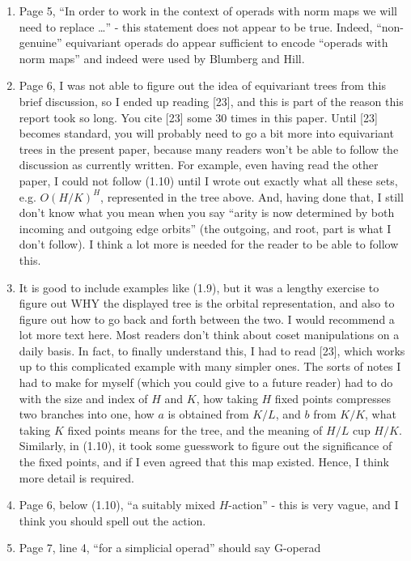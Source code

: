 \documentclass{article}
\begin{document}
\begin{enumerate}
\item
Page 5, ``In order to work in the context of operads with norm maps we will
need to replace \dots'' - this statement does not appear to be true. Indeed, ``non-genuine'' equivariant operads do appear sufficient to encode ``operads with norm maps'' and indeed were used by Blumberg and Hill. 

\item
Page 6, I was not able to figure out the idea of equivariant trees from this brief discussion, so I ended up reading [23], and this is part of the reason this report took so long. You cite [23] some 30 times in this paper. Until [23] becomes standard, you will probably need to go a bit more into equivariant trees in the present paper, because many readers won't be able to follow the discussion as currently written. For example, even having read the other paper, I could not follow (1.10) until I wrote out exactly what all these sets, e.g. $O(H/K)^H$, represented in the tree above. And, having done that, I still don't know what you mean when you say ``arity is now determined by both incoming and outgoing edge orbits'' (the outgoing, and root, part is what I don't follow). I think a lot more is needed for the reader to be able to follow this.

\item 
It is good to include examples like (1.9), but it was a lengthy exercise to figure out WHY the displayed tree is the orbital representation, and also to figure out how to go back and forth between the two. I would recommend a lot more text here. Most readers don't think about coset manipulations on a daily basis. In fact, to finally understand this, I had to read [23], which works up to this complicated example with many simpler ones. The sorts of notes I had to make for myself (which you could give to a future reader) had to do with the size and index of $H$ and $K$, how taking $H$ fixed points compresses two branches into one, how $a$ is obtained from $K/L$, and $b$ from $K/K$, what taking $K$ fixed points means for the tree, and the meaning of $H/L$ cup $H/K$. Similarly, in (1.10), it took some guesswork to figure out the significance of the fixed points, and if I even agreed that this map existed. Hence, I think more detail is required.

\item
Page 6, below (1.10), ``a suitably mixed $H$-action'' - this is very vague, and I think you should spell out the action.

\item
Page 7, line 4, ``for a simplicial operad'' should say G-operad


\end{enumerate}
\end{document}
